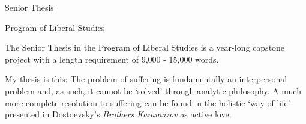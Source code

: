 \documentclass{resume} %
\begin{document}
\begin{rSection}{Senior Thesis}
\begin{rSubsection}{Program of Liberal Studies}{}{}{}
\item The Senior Thesis in the Program of Liberal Studies is a year-long capstone project with a length requirement of 9,000 - 15,000 words.
\item My thesis is this: The problem of suffering is fundamentally an interpersonal problem and, as such, it cannot be ‘solved’ through analytic philosophy. A much more complete resolution to suffering can be found in the holistic ‘way of life’ presented in Dostoevsky's \emph{Brothers Karamazov} as active love.
\end{rSubsection}
\end{rSection}
\end{document}
